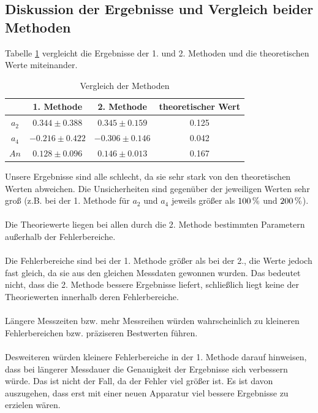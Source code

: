 \documentclass[a4paper,titlepage]{scrartcl}
\numberwithin{equation}{section}
\begin{document}
\subsection{Diskussion der Ergebnisse und Vergleich beider Methoden}
Tabelle \ref{tab:comparison} vergleicht die Ergebnisse der 1. und 2. Methoden und die theoretischen Werte miteinander.
\begin{table}[H]
\centering
\begin{tabular}{c|c|c|c}
& 1. Methode & 2. Methode & theoretischer Wert\\
\hline
$a_2$ & $0.344 \pm 0.388$ & $0.345 \pm 0.159$ & 0.125\\
$a_4$ & $-0.216 \pm 0.422$ & $-0.306 \pm 0.146$ & 0.042\\
$An$ & $0.128 \pm 0.096$ & $0.146 \pm 0.013$ & 0.167\\
\end{tabular}
\caption{Vergleich der Methoden}
\label{tab:comparison}
\end{table}
Unsere Ergebnisse sind alle schlecht, da sie sehr stark von den theoretischen Werten abweichen. Die Unsicherheiten sind gegenüber der jeweiligen Werten sehr groß (z.B. bei der 1. Methode für $a_2$ und $a_4$ jeweils größer als $\unit[100]{\%}$ und $\unit[200]{\%}$).\\ \\
Die Theoriewerte liegen bei allen durch die 2. Methode bestimmten Parametern außerhalb der Fehlerbereiche.\\ \\
Die Fehlerbereiche sind bei der 1. Methode größer als bei der 2., die Werte jedoch fast gleich, da sie aus den gleichen Messdaten gewonnen wurden. Das bedeutet nicht, dass die 2. Methode bessere Ergebnisse liefert, schließlich liegt keine der Theoriewerten innerhalb deren Fehlerbereiche.\\ \\
Längere Messzeiten bzw. mehr Messreihen würden wahrscheinlich zu kleineren Fehlerbereichen bzw. präziseren Bestwerten führen.\\ \\
Desweiteren würden kleinere Fehlerbereiche in der 1. Methode darauf hinweisen, dass bei längerer Messdauer die Genauigkeit der Ergebnisse sich verbessern würde. Das ist nicht der Fall, da der Fehler viel größer ist. Es ist davon auszugehen, dass erst mit einer neuen Apparatur viel bessere Ergebnisse zu erzielen wären.


\end{document}
